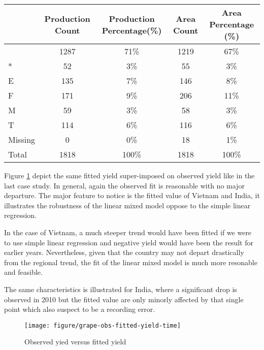 \documentclass[nojss]{jss}\usepackage[]{graphicx}\usepackage[]{color}
\makeatletter
\def\maxwidth{ %
  \ifdim\Gin@nat@width>\linewidth
    \linewidth
  \else
    \Gin@nat@width
  \fi
}
\newenvironment{knitrout}{}{} %
\makeatother
\begin{document}
\begin{table}[ht]
\centering
\begin{tabular}{|l|c|c|c|c|}
  \hline
 & Production Count & Production Percentage(\%) & Area Count & Area Percentage (\%) \\ 
  \hline
  & 1287 & 71\% & 1219 & 67\% \\ 
  * & 52 & 3\% & 55 & 3\% \\ 
  E & 135 & 7\% & 146 & 8\% \\ 
  F & 171 & 9\% & 206 & 11\% \\ 
  M & 59 & 3\% & 58 & 3\% \\ 
  T & 114 & 6\% & 116 & 6\% \\ 
  Missing & 0 & 0\% & 18 & 1\% \\ 
  Total & 1818 & 100\% & 1818 & 100\% \\ 
   \hline
\end{tabular}
\end{table}









Figure \ref{fig:grape-obs-fitted-yield-time} depict the same fitted
yield super-imposed on observed yield like in the last case study. In
general, again the observed fit is reasonable with no major
departure. The major feature to notice is the fitted value of Vietnam
and India, it illustrates the robustness of the linear mixed model
oppose to the simple linear regression. 

In the case of Vietnam, a much steeper trend would have been fitted if
we were to use simple linear regression and negative yield would have
been the result for earlier years. Nevertheless, given that the
country may not depart drastically from the regional trend, the fit of
the linear mixed model is much more resonable and feasible.

The same characteristics is illustrated for India, where a significant
drop is observed in 2010 but the fitted value are only minorly
affected by that single point which also suspect to be a recording
error.



\begin{knitrout}
\color{fgcolor}\begin{figure}[!ht]


{\centering \texttt{[image: figure/grape-obs-fitted-yield-time]} 

}

\caption[Observed yied versus fitted yield]{Observed yied versus fitted yield\label{fig:grape-obs-fitted-yield-time}}
\end{figure}


\end{knitrout}
\end{document}
